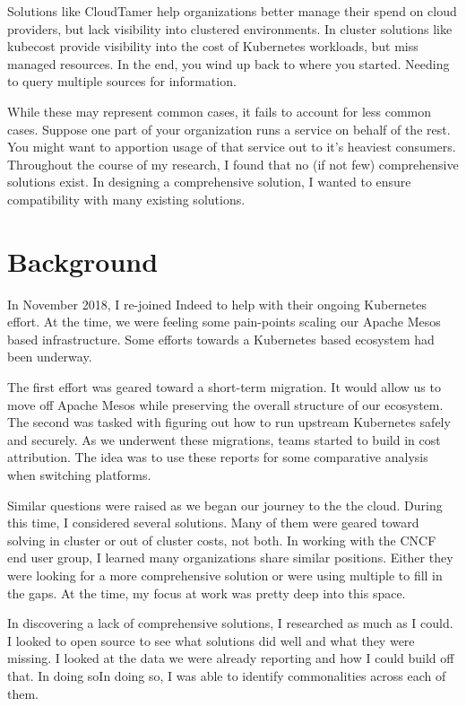 \documentclass[10pt, a4paper, twocolumn]{article}
\begin{document}
  Solutions like CloudTamer help organizations better manage their spend on cloud providers, but lack visibility into clustered environments.
  In cluster solutions like kubecost provide visibility into the cost of Kubernetes workloads, but miss managed resources.
  In the end, you wind up back to where you started.
  Needing to query multiple sources for information.

  While these may represent common cases, it fails to account for less common cases.
  Suppose one part of your organization runs a service on behalf of the rest.
  You might want to apportion usage of that service out to it's heaviest consumers.
  Throughout the course of my research, I found that no (if not few) comprehensive solutions exist.
  In designing a comprehensive solution, I wanted to ensure compatibility with many existing solutions.


\section*{Background}
  In November 2018, I re-joined Indeed to help with their ongoing Kubernetes effort.
  At the time, we were feeling some pain-points scaling our Apache Mesos based infrastructure.
  Some efforts towards a Kubernetes based ecosystem had been underway.

  The first effort was geared toward a short-term migration.
  It would allow us to move off Apache Mesos while preserving the overall structure of our ecosystem.
  The second was tasked with figuring out how to run upstream Kubernetes safely and securely.
  As we underwent these migrations, teams started to build in cost attribution.
  The idea was to use these reports for some comparative analysis when switching platforms.

  Similar questions were raised as we began our journey to the the cloud.
  During this time, I considered several solutions.
  Many of them were geared toward solving in cluster or out of cluster costs, not both.
  In working with the CNCF end user group, I learned many organizations share similar positions.
  Either they were looking for a more comprehensive solution or were using multiple to fill in the gaps.
  At the time, my focus at work was pretty deep into this space.

  In discovering a lack of comprehensive solutions, I researched as much as I could.
  I looked to open source to see what solutions did well and what they were missing.
  I looked at the data we were already reporting and how I could build off that.
  In doing soIn doing so, I was able to identify commonalities across each of them.
\end{document}
